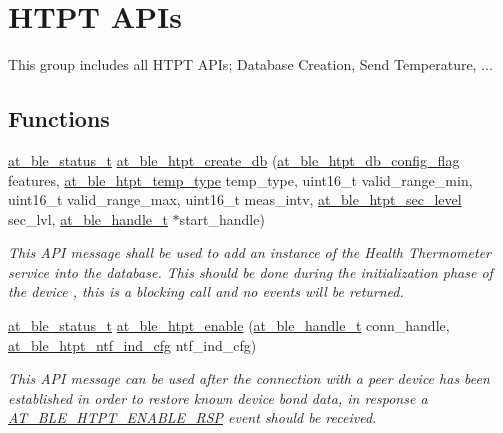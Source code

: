 \hypertarget{group__htpt__group}{}\section{H\+T\+PT A\+P\+Is}
\label{group__htpt__group}


This group includes all H\+T\+PT A\+P\+Is; Database Creation, Send Temperature, ...  


\subsection*{Functions}
\begin{DoxyCompactItemize}
\item 
\mbox{\hyperlink{group__error__codes__group_ga3b1db9b95feb157b3c188ca27fe76988}{at\+\_\+ble\+\_\+status\+\_\+t}} \mbox{\hyperlink{group__htpt__group_ga2f9864d034b157d76216d1b7284b568b}{at\+\_\+ble\+\_\+htpt\+\_\+create\+\_\+db}} (\mbox{\hyperlink{at__ble__api_8h_af0538ef74570e97a4abdcc7263fdfcdd}{at\+\_\+ble\+\_\+htpt\+\_\+db\+\_\+config\+\_\+flag}} features, \mbox{\hyperlink{at__ble__api_8h_a236445568b928ababcce95965c981348}{at\+\_\+ble\+\_\+htpt\+\_\+temp\+\_\+type}} temp\+\_\+type, uint16\+\_\+t valid\+\_\+range\+\_\+min, uint16\+\_\+t valid\+\_\+range\+\_\+max, uint16\+\_\+t meas\+\_\+intv, \mbox{\hyperlink{at__ble__api_8h_a3da24809ec703fda904a0a3b4c85e350}{at\+\_\+ble\+\_\+htpt\+\_\+sec\+\_\+level}} sec\+\_\+lvl, \mbox{\hyperlink{at__ble__api_8h_abd23646d0c662860741f787efc8456f2}{at\+\_\+ble\+\_\+handle\+\_\+t}} $\ast$start\+\_\+handle)
\begin{DoxyCompactList}\small\item\em This A\+PI message shall be used to add an instance of the Health Thermometer service into the database. This should be done during the initialization phase of the device , this is a blocking call and no events will be returned. \end{DoxyCompactList}\item 
\mbox{\hyperlink{group__error__codes__group_ga3b1db9b95feb157b3c188ca27fe76988}{at\+\_\+ble\+\_\+status\+\_\+t}} \mbox{\hyperlink{group__htpt__group_ga1bac2afa579331c8bf3a7bf3715f4079}{at\+\_\+ble\+\_\+htpt\+\_\+enable}} (\mbox{\hyperlink{at__ble__api_8h_abd23646d0c662860741f787efc8456f2}{at\+\_\+ble\+\_\+handle\+\_\+t}} conn\+\_\+handle, \mbox{\hyperlink{at__ble__api_8h_ae35b76480ab773fe13f5dfb9f78a4b28}{at\+\_\+ble\+\_\+htpt\+\_\+ntf\+\_\+ind\+\_\+cfg}} ntf\+\_\+ind\+\_\+cfg)
\begin{DoxyCompactList}\small\item\em This A\+PI message can be used after the connection with a peer device has been established in order to restore known device bond data, in response a \mbox{\hyperlink{at__ble__api_8h_a3324640b95f33169515f89738ed5baeba0217704aaf8283258dd02858769e6008}{A\+T\+\_\+\+B\+L\+E\+\_\+\+H\+T\+P\+T\+\_\+\+E\+N\+A\+B\+L\+E\+\_\+\+R\+SP}} event should be received. \end{DoxyCompactList}\item 

\end{DoxyCompactItemize}
